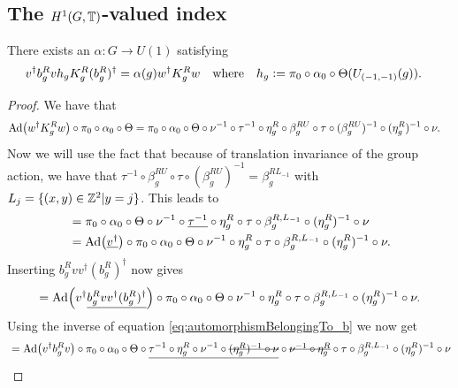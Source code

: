 \documentclass[11pt,a4paper,twoside]{article}
\numberwithin{equation}{section}
\begin{document}
	\subsection{The \texorpdfstring{$H^1(G,\mathbb T)$}{H1}-valued index}\label{sec:DefinitionH1Index}
	
	\begin{lemma}\label{lem:DefinitionAlpha}
		There exists an $\alpha:G\rightarrow U(1)$ satisfying
		\begin{align}\label{eq:DefinitionOfTheH_1Index}
			v^\dagger b_g^R vh_g K_g^R (b_g^R)^\dagger&=\alpha(g)w^\dagger K_g^R w&&\text{where}&h_g&\vcentcolon=\pi_0\circ\alpha_0\circ\Theta(U_{(-1,-1)}(g)).
		\end{align}
	\end{lemma}
	\begin{proof}
		We have that
		\begin{align}
			&\Ad{w^\dagger K_g^R w}\circ\pi_0\circ\alpha_0\circ\Theta=\pi_0\circ\alpha_0\circ\Theta\circ\nu^{-1}\circ\tau^{-1}\circ\eta_g^R\circ\beta_g^{RU}\circ\tau\circ(\beta_g^{RU})^{-1}\circ(\eta_g^R)^{-1}\circ\nu.
		\end{align}
		Now we will use the fact that because of translation invariance of the group action, we have that $\tau^{-1}\circ\beta_g^{RU}\circ\tau\circ(\beta_g^{RU})^{-1}=\beta_g^{RL_{-1}}$ with $L_j=\{(x,y)\in\mathbb Z^2|y=j\}$. This leads to
		\begin{align}
			&=\pi_0\circ\alpha_0\circ\Theta\circ\nu^{-1}\circ\underline{\tau^{-1}}\circ\eta_g^R\circ\tau\circ\beta_g^{R,L_{-1}}\circ(\eta_g^R)^{-1}\circ\nu\\
			\nonumber
			&=\Ad{\underline{v^\dagger}}\circ \pi_0\circ\alpha_0\circ\Theta\circ\nu^{-1}\circ\eta_g^R\circ\tau\circ\beta_g^{R,L_{-1}}\circ(\eta_g^R)^{-1}\circ\nu.
		\end{align}
		Inserting $b^R_g v v^\dagger (b^R_g)^\dagger$ now gives
		\begin{equation}
			=\Ad{v^\dagger\underline{b^R_g v v^\dagger (b^R_g)^\dagger}}\circ \pi_0\circ\alpha_0\circ\Theta\circ\nu^{-1}\circ\eta_g^R\circ\tau\circ\beta_g^{R,L_{-1}}\circ(\eta_g^R)^{-1}\circ\nu.
		\end{equation}
		Using the inverse of equation \eqref{eq:automorphismBelongingTo_b} we now get
		\begin{align}
			&=\Ad{v^\dagger b^R_g v }\circ \pi_0\circ\alpha_0\circ\Theta\circ\underline{\tau^{-1}\circ\eta_g^R\circ\nu^{-1}\circ\stkout{(\eta_g^R)^{-1}\circ\nu}}\circ\stkout{\nu^{-1}\circ\eta_g^R}\circ\tau\circ\beta_g^{R,L_{-1}}\circ(\eta_g^R)^{-1}\circ\nu\\

\end{align}
\end{proof}
\end{document}
